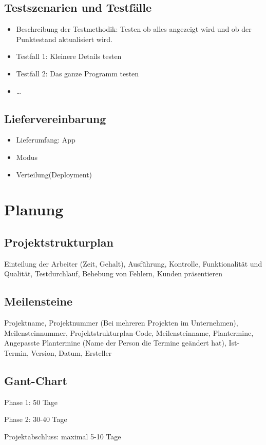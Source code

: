 \subsection{Testszenarien und Testfälle}
\begin{itemize}
	\item Beschreibung der Testmethodik:
	Testen ob alles angezeigt wird und ob der Punktestand aktualisiert wird.
	\item Testfall 1:
	Kleinere Details testen
	\item Testfall 2:
	Das ganze Programm testen
	\item \ldots
\end{itemize}
\subsection{Liefervereinbarung}
\begin{itemize}
	\item Lieferumfang: App
	\item Modus
	\item Verteilung(Deployment)
\end{itemize}
\section{Planung}
\subsection{Projektstrukturplan}

Einteilung der Arbeiter (Zeit, Gehalt), Ausführung, Kontrolle, Funktionalität und Qualität, Testdurchlauf, Behebung von Fehlern, Kunden präsentieren 
\subsection{Meilensteine}

Projektname,
Projektnummer (Bei mehreren Projekten im Unternehmen),
Meilensteinnummer,
Projektstrukturplan-Code,
Meilensteinname,
Plantermine,
Angepasste Plantermine (Name der Person die Termine geändert hat),
Ist-Termin,
Version, Datum, Ersteller

\subsection{Gant-Chart}

Phase 1: 50 Tage

Phase 2: 30-40 Tage

Projektabschluss: maximal 5-10 Tage

